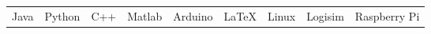 
\begin{center}
\begin{tabular}{c c c c c c c c c}
Java & Python & C++ & Matlab & Arduino & LaTeX & Linux & Logisim & Raspberry Pi\\
\end{tabular}
\end{center}
